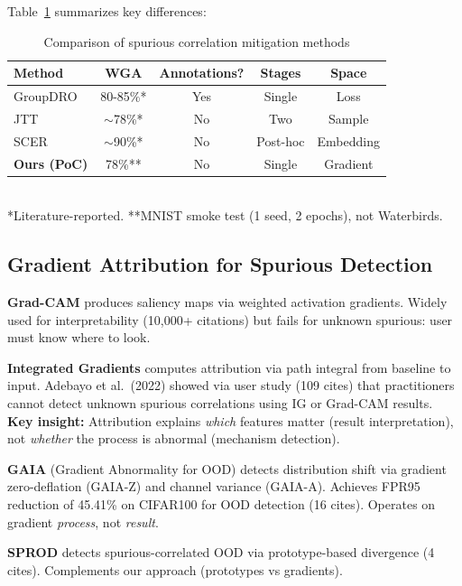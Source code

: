 Table~\ref{tab:comparison} summarizes key differences:

\begin{table}[t]
\centering
\caption{Comparison of spurious correlation mitigation methods}
\label{tab:comparison}
\begin{tabular}{lcccc}
\toprule
Method & WGA & Annotations? & Stages & Space \\
\midrule
GroupDRO \cite{sagawa2019distributionally} & 80-85\%* & Yes & Single & Loss \\
JTT \cite{liu2021just} & $\sim$78\%* & No & Two & Sample \\
SCER \cite{park2025spurious} & $\sim$90\%* & No & Post-hoc & Embedding \\
\textbf{Ours (PoC)} & 78\%** & No & Single & Gradient \\
\bottomrule
\end{tabular}
\\[0.5em]
\small{*Literature-reported. **MNIST smoke test (1 seed, 2 epochs), not Waterbirds.}
\end{table}

\subsection{Gradient Attribution for Spurious Detection}

\textbf{Grad-CAM} \cite{selvaraju2017grad} produces saliency maps via weighted activation gradients. Widely used for interpretability (10,000+ citations) but fails for unknown spurious: user must know where to look.

\textbf{Integrated Gradients} \cite{sundararajan2017axiomatic} computes attribution via path integral from baseline to input. Adebayo et al.~(2022) \cite{adebayo2022post} showed via user study (109 cites) that practitioners cannot detect unknown spurious correlations using IG or Grad-CAM results. \textbf{Key insight:} Attribution explains \emph{which} features matter (result interpretation), not \emph{whether} the process is abnormal (mechanism detection).

\textbf{GAIA} (Gradient Abnormality for OOD) \cite{chen2023exploring} detects distribution shift via gradient zero-deflation (GAIA-Z) and channel variance (GAIA-A). Achieves FPR95 reduction of 45.41\% on CIFAR100 for OOD detection (16 cites). Operates on gradient \emph{process}, not \emph{result}.

\textbf{SPROD} \cite{lee2025detecting} detects spurious-correlated OOD via prototype-based divergence (4 cites). Complements our approach (prototypes vs gradients).

